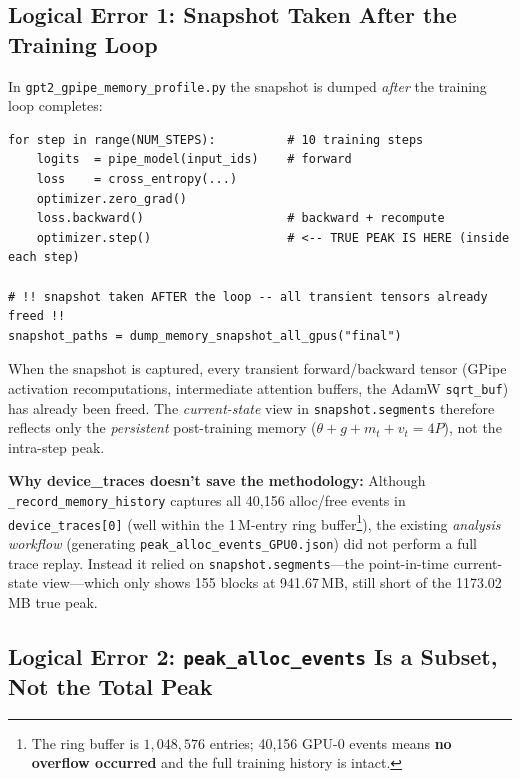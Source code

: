 \documentclass[11pt,a4paper]{article}
\begin{document}
\subsection{Logical Error 1: Snapshot Taken After the Training Loop}
\label{sec:err1timing}

In \texttt{gpt2\_gpipe\_memory\_profile.py} the snapshot is dumped
\emph{after} the training loop completes:

\begin{lstlisting}[caption={Incorrect snapshot placement in
    \texttt{gpt2\_gpipe\_memory\_profile.py} (abridged).}]
for step in range(NUM_STEPS):          # 10 training steps
    logits  = pipe_model(input_ids)    # forward
    loss    = cross_entropy(...)
    optimizer.zero_grad()
    loss.backward()                    # backward + recompute
    optimizer.step()                   # <-- TRUE PEAK IS HERE (inside each step)

# !! snapshot taken AFTER the loop -- all transient tensors already freed !!
snapshot_paths = dump_memory_snapshot_all_gpus("final")
\end{lstlisting}

When the snapshot is captured, every transient forward/backward tensor
(GPipe activation recomputations, intermediate attention buffers, the AdamW
\texttt{sqrt\_buf}) has already been freed.
The \emph{current-state} view in \texttt{snapshot.segments} therefore
reflects only the \emph{persistent} post-training memory
($\theta + g + m_t + v_t = 4P$), not the intra-step peak.

\medskip
\noindent\textbf{Why device\_traces doesn't save the methodology:}
Although \texttt{\_record\_memory\_history} captures all 40{,}156 alloc/free
events in \texttt{device\_traces[0]} (well within the 1\,M-entry ring
buffer\footnote{The ring buffer is $1{,}048{,}576$ entries; 40{,}156 GPU-0
events means \textbf{no overflow occurred} and the full training history is
intact.}), the existing \emph{analysis workflow} (generating
\texttt{peak\_alloc\_events\_GPU0.json}) did not perform a full trace replay.
Instead it relied on \texttt{snapshot.segments}---the point-in-time
current-state view---which only shows 155 blocks at 941.67\,MB, still
short of the 1173.02\,MB true peak.

\subsection{Logical Error 2: \texttt{peak\_alloc\_events} Is a Subset,
            Not the Total Peak}
\label{sec:err2subset}
\end{document}
